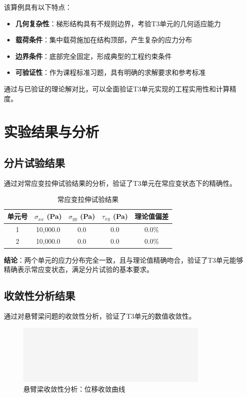 \documentclass[12pt,a4paper]{article}
\begin{document}
该算例具有以下特点：
\begin{itemize}
    \item \textbf{几何复杂性}：梯形结构具有不规则边界，考验T3单元的几何适应能力
    \item \textbf{载荷条件}：集中载荷施加在结构顶部，产生复杂的应力分布
    \item \textbf{边界条件}：底部完全固定，形成典型的工程约束条件
    \item \textbf{可验证性}：作为课程标准习题，具有明确的求解要求和参考标准
\end{itemize}

通过与已验证的理论解对比，可以全面验证T3单元实现的工程实用性和计算精度。

\section{实验结果与分析}

\subsection{分片试验结果}

通过对常应变拉伸试验结果的分析，验证了T3单元在常应变状态下的精确性。

\begin{table}[H]
\centering
\caption{常应变拉伸试验结果}
\begin{tabular}{ccccc}
\toprule
单元号 & $\sigma_{xx}$ (Pa) & $\sigma_{yy}$ (Pa) & $\tau_{xy}$ (Pa) & 理论值偏差 \\
\midrule
1 & 10,000.0 & 0.0 & 0.0 & 0.0\% \\
2 & 10,000.0 & 0.0 & 0.0 & 0.0\% \\
\bottomrule
\end{tabular}
\end{table}

\textbf{结论}：两个单元的应力分布完全一致，且与理论值精确吻合，验证了T3单元能够精确表示常应变状态，满足分片试验的基本要求。

\subsection{收敛性分析结果}

通过对悬臂梁问题的收敛性分析，验证了T3单元的数值收敛性。

\begin{figure}[H]
\centering
\includegraphics[width=0.85\textwidth]{img/empty.png}
\caption{悬臂梁收敛性分析：位移收敛曲线}
\label{fig:convergence_curve}
\end{figure}
\end{document}
